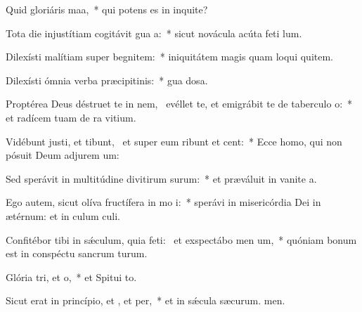 \item Quid gloriáris  maa,~* qui potens es in inquite?
\item Tota die injustítiam cogitávit gua a:~* sicut novácula acúta feti lum.
\item Dilexísti malítiam super begnitem:~* iniquitátem magis quam loqui quitem.
\item Dilexísti ómnia verba præcipitinis:~* gua dosa.
\item Proptérea Deus déstruet te in nem,~\pscross{} evéllet te, et emigrábit te de taberculo o:~* et radícem tuam de ra vitium.
\item Vidébunt justi, et tibunt,~\pscross{} et super eum ribunt et cent:~* Ecce homo, qui non pósuit Deum adjurem um:
\item Sed sperávit in multitúdine divitirum surum:~* et præváluit in vanite a.
\item Ego autem, sicut olíva fructífera in mo i:~* sperávi in misericórdia Dei in ætérnum: et in culum culi.
\item Confitébor tibi in sǽculum, quia feti:~\pscross{} et exspectábo men um,~* quóniam bonum est in conspéctu sancrum turum.
\item Glória tri, et o,~* et Spitui to.
\item Sicut erat in princípio, et , et per,~* et in sǽcula sæcurum. men.
